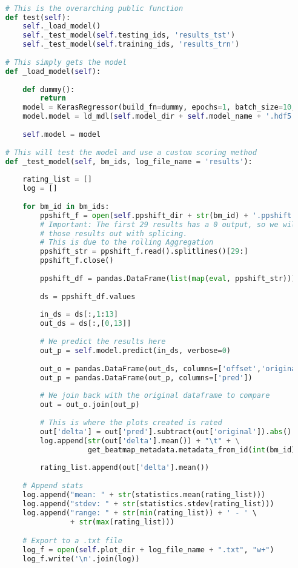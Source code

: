 \begin{lstlisting}[language=Python]

    # This is the overarching public function
    def test(self):
        self._load_model()
        self._test_model(self.testing_ids, 'results_tst')
        self._test_model(self.training_ids, 'results_trn')
        
    # This simply gets the model
    def _load_model(self):
        
        def dummy():
            return
        model = KerasRegressor(build_fn=dummy, epochs=1, batch_size=10, verbose=1)
        model.model = ld_mdl(self.model_dir + self.model_name + '.hdf5')
        
        self.model = model
    
    # This will test the model and use a custom scoring method
    def _test_model(self, bm_ids, log_file_name = 'results'):
        
        rating_list = []
        log = []
        
        for bm_id in bm_ids:
            ppshift_f = open(self.ppshift_dir + str(bm_id) + '.ppshift', 'r')
            # Important: The first 29 results has a 0 output, so we will cut
            # those results out with splicing.
            # This is due to the rolling Aggregation
            ppshift_str = ppshift_f.read().splitlines()[29:]
            ppshift_f.close()
            
            ppshift_df = pandas.DataFrame(list(map(eval, ppshift_str)))
            
            ds = ppshift_df.values
            
            in_ds = ds[:,1:13]
            out_ds = ds[:,[0,13]]
            
            # We predict the results here
            out_p = self.model.predict(in_ds, verbose=0)
            
            out_o = pandas.DataFrame(out_ds, columns=['offset','original'])
            out_p = pandas.DataFrame(out_p, columns=['pred'])
            
            # We join back with the original dataframe to compare
            out = out_o.join(out_p)
            
            # This is where the plots created is rated
            out['delta'] = out['pred'].subtract(out['original']).abs()
            log.append(str(out['delta'].mean()) + "\t" + \
                       get_beatmap_metadata.metadata_from_id(int(bm_id))
    
            rating_list.append(out['delta'].mean())
            
        # Append stats
        log.append("mean: " + str(statistics.mean(rating_list)))
        log.append("stdev: " + str(statistics.stdev(rating_list)))
        log.append("range: " + str(min(rating_list)) + ' - ' \
                   + str(max(rating_list))) 

        # Export to a .txt file
        log_f = open(self.plot_dir + log_file_name + ".txt", "w+")
        log_f.write('\n'.join(log))
\end{lstlisting}




